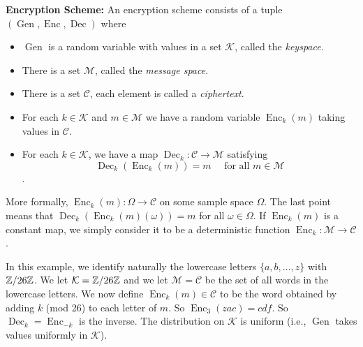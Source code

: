 \documentclass[twoside, a4paper, 10pt]{amsart}
\begin{document}
\textbf{Encryption Scheme:} An encryption scheme consists of a tuple $(\operatorname{Gen}, \operatorname{Enc}, \operatorname{Dec})$ where 

\begin{itemize} 
	\item $\operatorname{Gen}$ is a random variable with values in a set $\mathcal{K}$, called the \textit{keyspace}. 
	\item There is a set $\mathcal{M}$, called the \textit{message space}. 
	\item There is a set $\mathcal{C}$, each element is called a \textit{ciphertext}. 
	\item For each $k \in \mathcal{K}$ and $m \in \mathcal{M}$ we have a random variable $\operatorname{Enc}_k(m)$ taking values in $\mathcal{C}$.
	\item For each $k \in \mathcal{K}$, we have a map $\operatorname{Dec}_k:\mathcal{C} \to \mathcal{M}$ satisfying $$\operatorname{Dec}_k(\operatorname{Enc}_k(m)) = m \quad \text{ for all } m  \in \mathcal{M}$$. 

\end{itemize}

More formally, $\operatorname{Enc}_k(m): \Omega \to \mathcal{C}$ on some sample space $\Omega$. The last point means that $\operatorname{Dec}_k(\operatorname{Enc}_k(m)(\omega)) = m$ for all $\omega \in \Omega$. If $\operatorname{Enc}_k(m)$ is a constant map, we simply consider it to be a deterministic function $\operatorname{Enc}_k: \mathcal{M} \to \mathcal{C}$.

\begin{eg} In this example, we identify naturally the lowercase letters $\{a, b, \ldots, z\}$ with $\mathbb{Z}/26\mathbb{Z}$. We let $\mathcal{K} = \mathbb{Z}/26\mathbb{Z}$ and we let $\mathcal{M} = \mathcal{C}$ be the set of all words in the lowercase letters. We now define $\operatorname{Enc}_k(m) \in \mathcal{C}$ to be the word obtained by adding $k$ (mod 26) to each letter of $m$. So $\operatorname{Enc}_3(zac) = cdf $. So $\operatorname{Dec}_k = \operatorname{Enc}_{-k}$ is the inverse. The distribution on $\mathcal{K}$ is uniform (i.e., $\operatorname{Gen}$ takes values uniformly in $\mathcal{K}$).

\end{eg}
\end{document}
